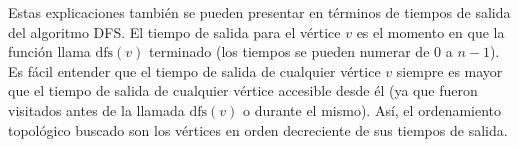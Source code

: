 Estas explicaciones también se pueden presentar en términos de tiempos de salida del algoritmo DFS. El 
tiempo de salida para el vértice $v$ es el momento en que la función llama $\text{dfs}(v)$ terminado 
(los tiempos se pueden numerar de $0$ a $n-1$). Es fácil entender que el tiempo de salida de cualquier 
vértice $v$ siempre es mayor que el tiempo de salida de cualquier vértice accesible desde él (ya que 
fueron visitados antes de la llamada $\text{dfs}(v)$ o durante el mismo). Así, el ordenamiento 
topológico buscado son los vértices en orden decreciente de sus tiempos de salida.